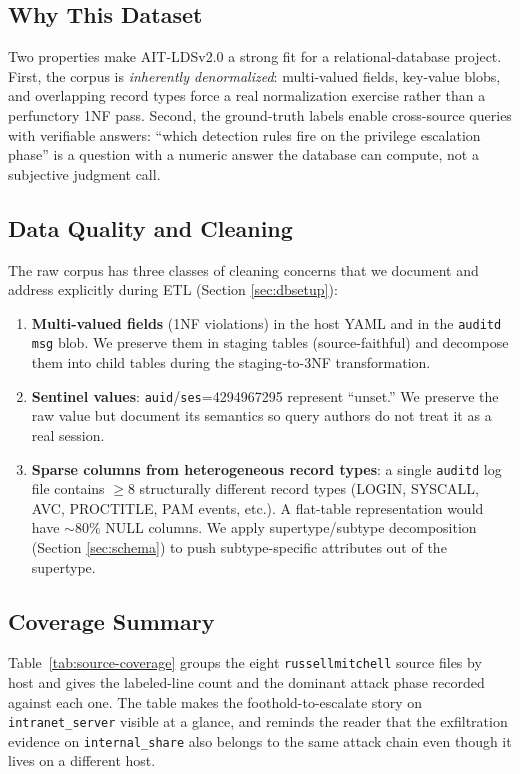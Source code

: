 \subsection{Why This Dataset}
Two properties make AIT-LDSv2.0 a strong fit for a relational-database
project. First, the corpus is \emph{inherently denormalized}: multi-valued
fields, key-value blobs, and overlapping record types force a real
normalization exercise rather than a perfunctory 1NF pass. Second, the
ground-truth labels enable cross-source queries with verifiable answers:
``which detection rules fire on the privilege escalation phase'' is a
question with a numeric answer the database can compute, not a subjective
judgment call.

\subsection{Data Quality and Cleaning}
The raw corpus has three classes of cleaning concerns that we document and
address explicitly during ETL (Section \ref{sec:dbsetup}):
\begin{enumerate}
  \item \textbf{Multi-valued fields} (1NF violations) in the host YAML and
    in the \texttt{auditd} \texttt{msg} blob. We preserve them in staging
    tables (source-faithful) and decompose them into child tables during
    the staging-to-3NF transformation.
  \item \textbf{Sentinel values}: \texttt{auid}/\texttt{ses}=4294967295
    represent ``unset.'' We preserve the raw value but document its
    semantics so query authors do not treat it as a real session.
  \item \textbf{Sparse columns from heterogeneous record types}: a single
    \texttt{auditd} log file contains $\geq 8$ structurally different
    record types (LOGIN, SYSCALL, AVC, PROCTITLE, PAM events, etc.). A
    flat-table representation would have $\sim 80\%$ NULL columns. We
    apply supertype/subtype decomposition (Section \ref{sec:schema}) to
    push subtype-specific attributes out of the supertype.
\end{enumerate}

\subsection{Coverage Summary}
Table~\ref{tab:source-coverage} groups the eight \texttt{russellmitchell}
source files by host and gives the labeled-line count and the dominant
attack phase recorded against each one. The table makes the
foothold-to-escalate story on \texttt{intranet\_server} visible at a
glance, and reminds the reader that the exfiltration evidence on
\texttt{internal\_share} also belongs to the same attack chain even
though it lives on a different host.

